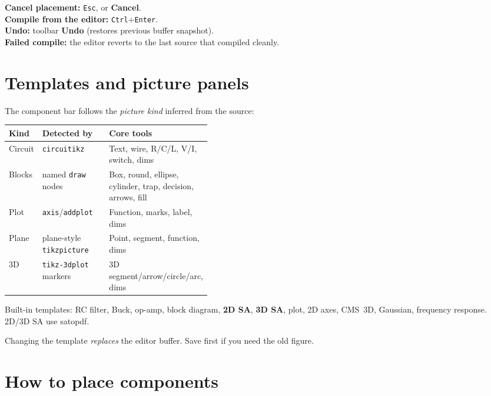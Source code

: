 \documentclass[a4paper]{ltxdoc}
\newcommand{\ui}[1]{\textbf{#1}}
\newcommand{\key}[1]{\texttt{#1}}
\begin{document}
\noindent\textbf{Cancel placement:} \key{Esc}, or \ui{Cancel}.\\
\textbf{Compile from the editor:} \key{Ctrl}+\key{Enter}.\\
\textbf{Undo:} toolbar \ui{Undo} (restores previous buffer snapshot).\\
\textbf{Failed compile:} the editor reverts to the last source that
compiled cleanly.

\section{Templates and picture panels}

The component bar follows the \emph{picture kind} inferred from the
source:

\begin{center}
{\small
\begin{tabular}{@{}llp{0.40\linewidth}@{}}
\toprule
Kind & Detected by & Core tools \\
\midrule
Circuit & \texttt{circuitikz} & Text, wire, R/C/L, V/I, switch, dims \\
Blocks & named \texttt{draw} nodes & Box, round, ellipse, cylinder,
  trap, decision, arrows, fill \\
Plot & \texttt{axis}/\texttt{addplot} & Function, marks, label, dims \\
Plane & plane-style \texttt{tikzpicture} & Point, segment, function, dims \\
3D & \texttt{tikz-3dplot} markers & 3D segment/arrow/circle/arc, dims \\
\bottomrule
\end{tabular}}
\end{center}

Built-in templates: RC filter, Buck, op-amp, block diagram, \textbf{2D SA},
\textbf{3D SA}, plot, 2D axes, CMS~3D, Gaussian, frequency response.
2D/3D SA use \textsf{satopdf}.

Changing the template \emph{replaces} the editor buffer.  Save first if
you need the old figure.

\section{How to place components}
\label{sec:place}
\end{document}
